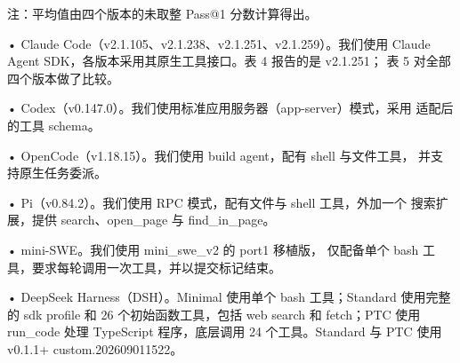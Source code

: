 注：平均值由四个版本的未取整 Pass@1 分数计算得出。

• Claude Code（v2.1.105、v2.1.238、v2.1.251、v2.1.259）。我们使用
Claude Agent SDK，各版本采用其原生工具接口。表 4 报告的是 v2.1.251；
表 5 对全部四个版本做了比较。

• Codex（v0.147.0）。我们使用标准应用服务器（app-server）模式，采用
适配后的工具 schema。

• OpenCode（v1.18.15）。我们使用 build agent，配有 shell 与文件工具，
并支持原生任务委派。

• Pi（v0.84.2）。我们使用 RPC 模式，配有文件与 shell 工具，外加一个
搜索扩展，提供 search、open\_page 与 find\_in\_page。

• mini-SWE。我们使用 mini\_swe\_v2 的 port1 移植版，
仅配备单个 bash 工具，要求每轮调用一次工具，并以提交标记结束。

• DeepSeek Harness（DSH）。Minimal 使用单个 bash 工具；Standard 使用完整的
sdk profile 和 26 个初始函数工具，包括 web search 和 fetch；PTC 使用
run\_code 处理 TypeScript 程序，底层调用 24 个工具。Standard 与 PTC 使用
v0.1.1+ custom.202609011522。